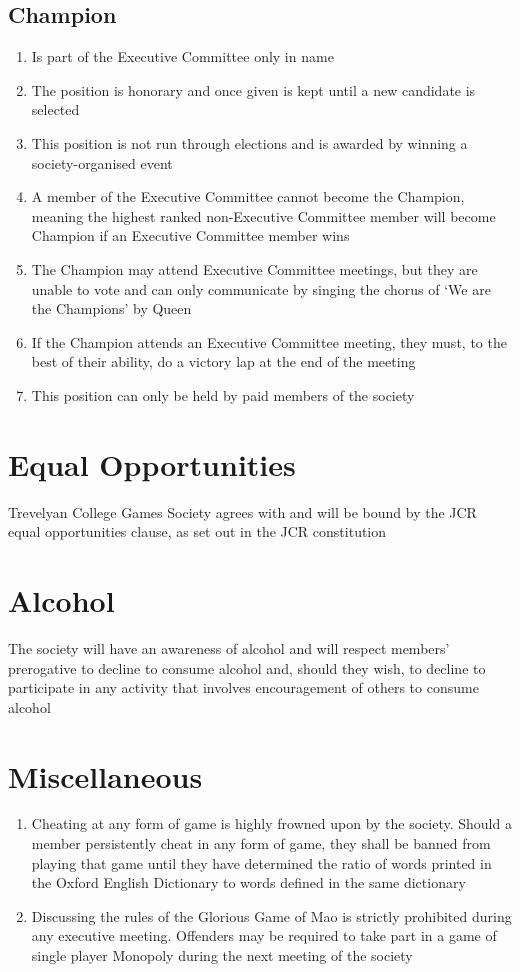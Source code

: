 \documentclass[hidelinks, 12pt, a4paper]{article}
\begin{document}
\subsection{Champion}
\begin{enumerate}
	\item Is part of the Executive Committee only in name
	\item The position is honorary and once given is kept until a new candidate is selected
	\item This position is not run through elections and is awarded by winning a society-organised event
	\item A member of the Executive Committee cannot become the Champion, meaning the highest ranked non-Executive Committee member will become Champion if an Executive Committee member wins
	\item The Champion may attend Executive Committee meetings, but they are unable to vote and can only communicate by singing the chorus of ‘We are the Champions’ by Queen
	\item If the Champion attends an Executive Committee meeting, they must, to the best of their ability, do a victory lap at the end of the meeting
	\item This position can only be held by paid members of the society
\end{enumerate}

\section{Equal Opportunities}
Trevelyan College Games Society agrees with and will be bound by the JCR equal opportunities clause, as set out in the JCR constitution

\section{Alcohol}
The society will have an awareness of alcohol and will respect members' prerogative to decline to consume alcohol and, should they wish, to decline to participate in any activity that involves encouragement of others to consume alcohol

\section{Miscellaneous}
\begin{enumerate}
	\item Cheating at any form of game is highly frowned upon by the society. Should a member persistently cheat in any form of game, they shall be banned from playing that game until they have determined the ratio of words printed in the Oxford English Dictionary to words defined in the same dictionary
	\item Discussing the rules of the Glorious Game of Mao is strictly prohibited during any executive meeting. Offenders may be required to take part in a game of single player Monopoly during the next meeting of the society
\end{enumerate}
\end{document}
